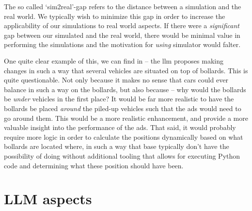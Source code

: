 The so called `sim2real'-gap refers to the distance between a simulation and the real world. We
typically wish to minimize this gap in order to increase the applicability of our simulations to
real world aspects. If there were a \emph{significant} gap between our simulated 
and the real world, there would be minimal value in performing the simulations and the motivation
for \emph{using} simulator would falter.







One quite clear example of this, we can find in
 -- the \acrshort{llm} proposes making changes
in such a way that several vehicles are situated on top of bollards. This is
quite questionable. Not only because it makes no sense that cars could ever
balance in such a way on the bollards, but also because -- why would the
bollards be \emph{under} vehicles in the first place? It would be far more
realistic to have the bollards be placed \emph{around} the piled-up vehicles
such that the \acrshort{ads} would need to go around them. This would be a more
realistic enhancement, and provide a more valuable insight into the performance
of the \acrshort{ads}. That said, it would probably require more logic in order
to calculate the positions dynamically based on what bollards are located where,
in such a way that base  typically don't have the possibility of
doing without additional tooling that allows for executing Python code and
determining what these position should have been.

\section{LLM aspects}\label{sec:discussionLlmAspects}

